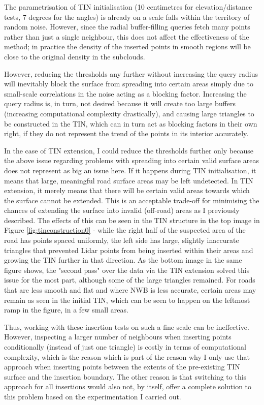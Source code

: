 The parametrisation of TIN initialisation (10 centimetres for elevation/distance tests, 7 degrees for the angles) is already on a scale falls within the territory of random noise. However, since the radial buffer-filling queries fetch many points rather than just a single neighbour, this does not affect the effectiveness of the method; in practice the density of the inserted points in smooth regions will be close to the original density in the subclouds.

However, reducing the thresholds any further without increasing the query radius will inevitably block the surface from spreading into certain areas simply due to small-scale correlations in the noise acting as a blocking factor. Increasing the query radius is, in turn, not desired because it will create too large buffers (increasing computational complexity drastically), and causing large triangles to be constructed in the TIN, which can in turn act as blocking factors in their own right, if they do not represent the trend of the points in its interior accurately.

In the case of TIN extension, I could reduce the thresholds further only because the above issue regarding problems with spreading into certain valid surface areas does not represent as big an issue here. If it happens during TIN initialisation, it means that large, meaningful road surface areas may be left undetected. In TIN extension, it merely means that there will be certain valid areas towards which the surface cannot be extended. This is an acceptable trade-off for minimising the chances of extending the surface into invalid (off-road) areas as I previously described. The effects of this can be seen in the TIN structure in the top image in Figure \ref{fig:tinconstruction0} - while the right half of the suspected area of the road has points spaced uniformly, the left side has large, slightly inaccurate triangles that prevented Lidar points from being inserted within their areas and growing the TIN further in that direction. As the bottom image in the same figure shows, the "second pass" over the data via the TIN extension solved this issue for the most part, although some of the large triangles remained. For roads that are less smooth and flat and where NWB is less accurate, certain areas may remain as seen in the initial TIN, which can be seen to happen on the leftmost ramp in the figure, in a few small areas.

Thus, working with these insertion tests on such a fine scale can be ineffective. However, inspecting a larger number of neighbours when inserting points conditionally (instead of just one triangle) is costly in terms of computational complexity, which is the reason which is part of the reason why I only use that approach when inserting points between the extents of the pre-existing TIN surface and the insertion boundary. The other reason is that switching to this approach for all insertions would also not, by itself, offer a complete solution to this problem based on the experimentation I carried out.

